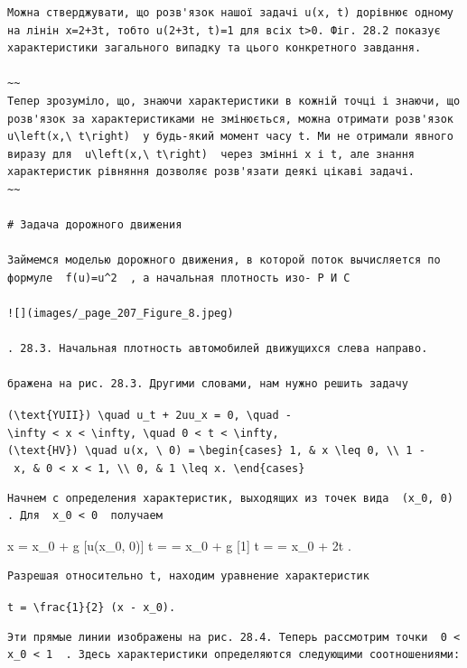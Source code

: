 \documentclass[
  ukrainian,
]{article}
\begin{document}
\begin{verbatim}
Можна стверджувати, що розв'язок нашої задачі u(x, t) дорівнює одному на лінін x=2+3t, тобто u(2+3t, t)=1 для всіх t>0. Фіг. 28.2 показує характеристики загального випадку та цього конкретного завдання.

~~
Тепер зрозуміло, що, знаючи характеристики в кожній точці і знаючи, що розв'язок за характеристиками не змінюється, можна отримати розв'язок  u\left(x,\ t\right)  у будь-який момент часу t. Ми не отримали явного виразу для  u\left(x,\ t\right)  через змінні x і t, але знання характеристик рівняння дозволяє розв'язати деякі цікаві задачі.
~~

# Задача дорожного движения

Займемся моделью дорожного движения, в которой поток вычисляется по формуле  f(u)=u^2  , а начальная плотность изо- Р И С

![](images/_page_207_Figure_8.jpeg)

. 28.3. Начальная плотность автомобилей движущихся слева направо.

бражена на рис. 28.3. Другими словами, нам нужно решить задачу
\end{verbatim}

\texttt{(\textbackslash{}text\{YUII\})\ \textbackslash{}quad\ u\_t\ +\ 2uu\_x\ =\ 0,\ \textbackslash{}quad\ -\textbackslash{}infty\ \textless{}\ x\ \textless{}\ \textbackslash{}infty,\ \textbackslash{}quad\ 0\ \textless{}\ t\ \textless{}\ \textbackslash{}infty,}
\texttt{(\textbackslash{}text\{HV\})\ \textbackslash{}quad\ u(x,\ \textbackslash{}\ 0)\ =}
\texttt{\textbackslash{}begin\{cases\}\ 1,\ \&\ x\ \textbackslash{}leq\ 0,\ \textbackslash{}\textbackslash{}\ 1\ -\ x,\ \&\ 0\ \textless{}\ x\ \textless{}\ 1,\ \textbackslash{}\textbackslash{}\ 0,\ \&\ 1\ \textbackslash{}leq\ x.\ \textbackslash{}end\{cases\}}

\begin{verbatim}
Начнем с определения характеристик, выходящих из точек вида  (x_0, 0)  . Для  x_0 < 0  получаем
\end{verbatim}

x = x\_0 + g {[}u(x\_0, 0){]} t = = x\_0 + g {[}1{]} t = = x\_0 + 2t .

\begin{verbatim}
Разрешая относительно t, находим уравнение характеристик
\end{verbatim}

\texttt{t\ =\ \textbackslash{}frac\{1\}\{2\}\ (x\ -\ x\_0).}

\begin{verbatim}
Эти прямые линии изображены на рис. 28.4. Теперь рассмотрим точки  0 < x_0 < 1  . Здесь характеристики определяются следующими соотношениями:
\end{verbatim}
\end{document}
